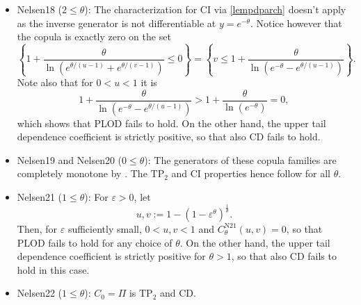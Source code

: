 \documentclass{article}
\def\of#1{\left(#1\right)} %
\def\inbrackets#1{\of{#1}} %
\def\setof#1{\left\{#1\right\}} %
\newcommand{\TP}{\mathrm{TP_2}}
\begin{document}
\begin{itemize}
    Then, the numerator in \eqref{frm:nelsen17log4} writes as 
    \[
        2^{\theta} a^{2} \theta^{2} + 2^{\theta} b^{2} + 2^{\theta + 1} b^{2} \theta - a^{2} \theta^{2} - 2 b^{2} \theta - b^{2}
        = \left(2^{\theta} - 1\right) \left(a^{2} \theta^{2} + (1+2 \theta)b^{2}\right)
    ,\]
    so for $\theta > 0$ numerator and denominator are clearly non-negative for any $y$, and thus the copula family is $\TP$ for $\theta > 0$.
    For $\theta \in (-1, 0)$, the denominator and $2^{\theta}-1$ are negative, so non-negativity of $(\log(\psi''))''$ is driven by $a^{2} \theta^{2} + (1+2 \theta)b^{2}$.
    This expression can be rewritten as 
    \[
        a^{2} \theta^{2} + (1+2 \theta)b^{2}
        = 2^{\theta + 1} (1+\theta)\theta\left(2^{\theta} \theta e^{y} + 2^{\theta} - 1\right) e^{y} + (\theta +1)^2 (2^\theta-1)^2
    ,\]
    and the right-hand side is indeed non-negative for $\theta \in (-1, 0)$, so the $\TP$-property follows also here.
    \item Nelsen18 ($2 \leq \theta$):
    The characterization for CI via \eqref{lempdparch} doesn't apply as the inverse generator is not differentiable at $y=e^{-\theta}$.
    Notice however that the copula is exactly zero on the set
    \[
        \setof{1+\frac{\theta}{\ln \left(e^{\theta /(u-1)}+e^{\theta /(v-1)}\right)} \leq 0}
        = \setof{v \leq 1 + \frac{\theta}{\ln\of{e^{-\theta} - e^{\theta/(u-1)}}}}
    .\]
    Note also that for $0<u<1$ it is
    \[
        1 + \frac{\theta}{\ln\of{e^{-\theta} - e^{\theta/(u-1)}}}
        > 1 + \frac{\theta}{\ln\of{e^{-\theta}}}
        = 0
    ,\]
    which shows that PLOD fails to hold.
    On the other hand, the upper tail dependence coefficient is strictly positive, so that also CD fails to hold. 
    \item Nelsen19 and Nelsen20 ($0 \leq \theta$):
    The generators of these copula families are completely monotone by \cite[Table 2]{hofert2008sampling}.
    The $\TP$ and CI properties hence follow for all $\theta$.
    \item Nelsen21 ($1 \leq \theta$): For $\varepsilon>0$, let
    \[
        u, v := 1 - \inbrackets{1-\varepsilon^\theta}^{\frac1{\theta}}
    .\]
    Then, for $\varepsilon$ sufficiently small, $0<u,v<1$ and $C^{\text{N21}}_\theta(u,v) = 0$, so that PLOD fails to hold for any choice of $\theta$.
    On the other hand, the upper tail dependence coefficient is strictly positive for $\theta>1$, so that also CD fails to hold in this case.
    \item Nelsen22 ($1 \leq \theta$): $C_{0}=\Pi$ is $\TP$ and CD.

\end{itemize}
\end{document}
